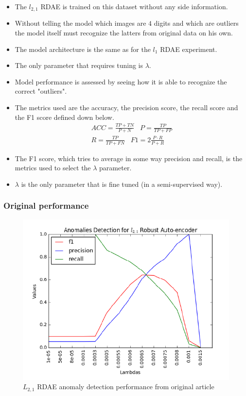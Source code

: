 \documentclass{beamer}
\theoremstyle{plain}
\theoremstyle{definition}
\theoremstyle{remark}
\begin{document}
\begin{frame}
	\begin{itemize}
		\item The $l_{2,1}$ RDAE is trained on this dataset without any side information.
		\item Without telling the model which images are $4$ digits and which are outliers the model itself must recognize the latters from original data on his own.
		\item The model architecture is the same as for the $l_1$ RDAE experiment.
		\item The only parameter that requires tuning is $\lambda$.
	\end{itemize}
\end{frame}

\begin{frame}
	\begin{itemize}
		\item Model performance is assessed by seeing how it is able to recognize the correct "outliers".
		\item The metrics used are the accuracy, the precision score, the recall score and the F1 score defined down below.
			\begin{align}
				ACC = \frac{TP+TN}{P+N}\;\;\; P = \frac{TP}{TP+FP}\\
				R = \frac{TP}{TP+FN} \;\;\; F1 = 2\frac{P\cdot R}{P+R}
			\end{align}
		\item The F1 score, which tries to average in some way precision and recall, is the metrics used to select the $\lambda$ parameter.
		\item $\lambda$ is the only parameter that is fine tuned (in a semi-supervised way).
	\end{itemize}
\end{frame}

\begin{frame}
	\frametitle{Original performance}
	\begin{figure}
		\centering
		\includegraphics[width=0.7\linewidth]{Images/l21_perf_article.png}
		\caption[]{$L_{2,1}$ RDAE anomaly detection performance from original article}
	\end{figure}
\end{frame}
\end{document}
